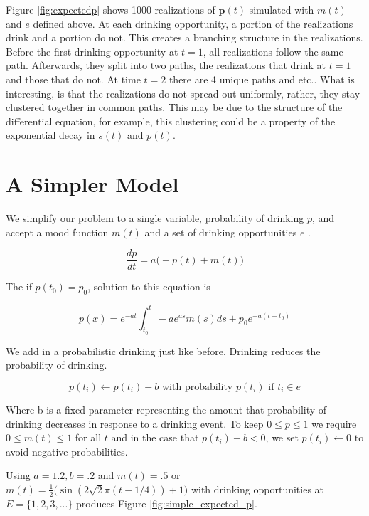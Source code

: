 \documentclass{journal}
\theoremstyle{definition}
\begin{document}
Figure \ref{fig:expectedp} shows 1000 realizations of $\mathbf{p}(t)$ simulated with $m(t)$ and $e$ defined above. At each drinking opportunity, a portion of the realizations drink and a portion do not. This creates a branching structure in the realizations. Before the first drinking opportunity at $t=1$, all realizations follow the same path. Afterwards, they split into two paths, the realizations that drink at $t=1$ and those that do not. At time $t=2$ there are 4 unique paths and etc.. What is interesting, is that the realizations do not spread out uniformly, rather, they stay clustered together in common paths. This may be due to the structure of the differential equation, for example, this clustering could be a property of the exponential decay in $s(t)$ and $p(t)$.

\section{A Simpler Model}

We simplify our problem to a single variable, probability of drinking $p$, and accept a mood function $m(t)$ and a set of drinking opportunities $e$ .

\[ 
\frac{dp}{dt} = a\big(-p(t) + m(t)\big) 
\]

The if $p(t_0) = p_0$, solution to this equation is 

\begin{equation}
\label{equ:simplemodel}
p(x) = e^{-at} \int_{t_0}^t -ae^{as}m(s)ds + p_0 e^{-a(t-t_0)}
\end{equation}

We add in a probabilistic drinking just like before. Drinking reduces the probability of drinking.

\begin{equation}
\label{equ:simplemodelupdate}
 p(t_i) \leftarrow p(t_i) - b\text{ with probability } p(t_i) \text{ if } t_i \in e
\end{equation}

Where b is a fixed parameter representing the amount that probability of drinking decreases in response to a drinking event. To keep $0 \leq p \leq 1$ we require $0 \leq m(t) \leq 1$ for all $t$ and in the case that $p(t_i) - b < 0$, we set $p(t_i) \leftarrow 0$ to avoid negative probabilities. 

Using $ a=1.2, b=.2$ and $m(t) = .5$ or $m(t) = \frac{1}{2}\big(\sin(2\sqrt{2}\pi (t - 1/4)) + 1\big)$ with drinking opportunities at $E = \{1, 2, 3, ...\}$ produces Figure \ref{fig:simple_expected_p}.
\end{document}
